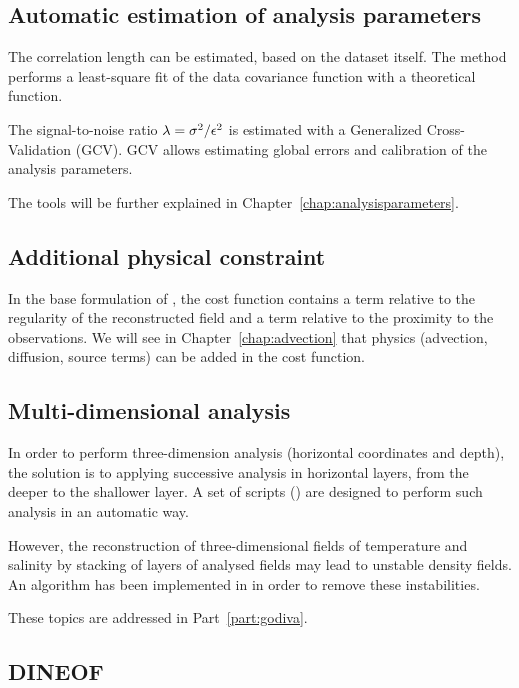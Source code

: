 \subsection{Automatic estimation of analysis parameters}

The correlation length can be estimated, based on the dataset itself. The method performs a least-square fit of the data covariance function with a theoretical function. 

The signal-to-noise ratio $\lambda=\sigma^{2}/\epsilon^{2}$ is estimated with a Generalized Cross-Validation (GCV). GCV allows estimating global errors and calibration of the analysis parameters. 

The tools will be further explained in Chapter~\ref{chap:analysisparameters}.
 
\subsection{Additional physical constraint}

In the base formulation of \diva, the cost function contains a term relative to the regularity of the reconstructed field and a term relative to the proximity to the observations. We will see in Chapter~\ref{chap:advection} that physics (advection, diffusion, source terms) can be added in the cost function.

\subsection{Multi-dimensional analysis}

In order to perform three-dimension analysis (horizontal coordinates and depth), the solution is to applying successive analysis in horizontal layers, from the deeper to the shallower layer. A set of scripts () are designed to perform such analysis in an automatic way.

However, the reconstruction of three-dimensional fields of temperature and salinity by stacking of layers of analysed fields may lead to unstable density fields. An algorithm has been implemented in \diva in order to remove these instabilities.

These topics are addressed in Part~\ref{part:godiva}.


\subsection{DINEOF\label{sec:DINEOF}}

